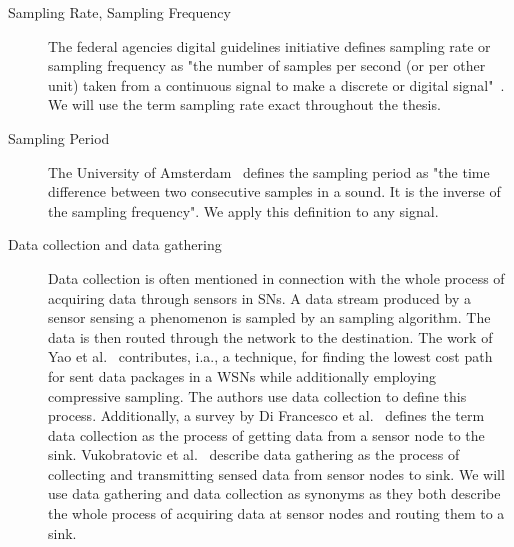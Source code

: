 \begin{description}
    \item[Sampling Rate, Sampling Frequency]
        The federal agencies digital guidelines initiative defines sampling
        rate or sampling frequency as "the number of samples per second (or per
        other unit) taken from a continuous signal to make a discrete or
        digital signal"~\cite{samplingrate}. We will use the term sampling rate
        exact throughout the thesis.
 
    \item[Sampling Period]
        The University of Amsterdam~\cite{samplingperiod} defines the sampling
        period as "the time difference between two consecutive samples in a
        sound. It is the inverse of the sampling frequency". We apply this
        definition to any signal.

    \item[Data collection and data gathering] 
        Data collection is often mentioned in connection with the whole process
        of acquiring data through sensors in \acp{SN}. A data stream produced
        by a sensor sensing a phenomenon is sampled by an sampling algorithm.
        The data is then routed through the network to the destination. The
        work of Yao et al.~\cite{yao2015edal} contributes, i.a., a technique,
        for finding the lowest cost path for sent data packages in a \acp{WSN}
        while additionally employing compressive sampling. The authors use data
        collection to define this process. Additionally, a survey by Di
        Francesco et al.~\cite{di2011data} defines the term data collection as
        the process of getting data from a sensor node to the sink.
        Vukobratovic et al.~\cite{vukobratovic2010rateless, zhang2016data}
        describe data gathering as the process of collecting and transmitting
        sensed data from sensor nodes to sink. We will use data gathering and
        data collection as synonyms as they both describe the whole process of
        acquiring data at sensor nodes and routing them to a sink.


\end{description}
